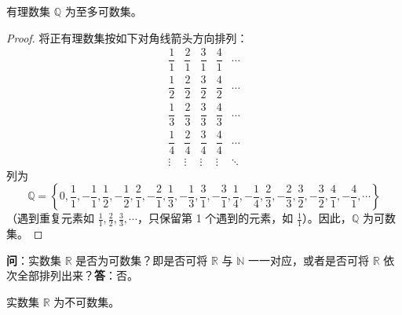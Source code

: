 \begin{lemma}\label{lem:1.3.2}
有理数集 $\mathbb{Q}$ 为至多可数集。
\end{lemma}

\begin{proof}
将正有理数集按如下对角线箭头方向排列：
\[
\begin{array}
{ccccc}
\dfrac{1}{1} & \dfrac{2}{1} & \dfrac{3}{1} & \dfrac{4}{1} & \cdots \\[2mm]
\dfrac{1}{2} & \dfrac{2}{2} & \dfrac{3}{2} & \dfrac{4}{2} & \cdots \\[2mm]
\dfrac{1}{3} & \dfrac{2}{3} & \dfrac{3}{3} & \dfrac{4}{3} & \cdots \\[2mm]
\dfrac{1}{4} & \dfrac{2}{4} & \dfrac{3}{4} & \dfrac{4}{4} & \cdots \\
\vdots & \vdots & \vdots & \vdots & \ddots
\end{array}
\]
列为
\[
\mathbb{Q} = \left\{0, \frac{1}{1}, -\frac{1}{1}, \frac{1}{2}, -\frac{1}{2}, \frac{2}{1}, -\frac{2}{1}, \frac{1}{3}, -\frac{1}{3}, \frac{3}{1}, -\frac{3}{1}, \frac{1}{4}, -\frac{1}{4}, \frac{2}{3}, -\frac{2}{3}, \frac{3}{2}, -\frac{3}{2}, \frac{4}{1}, -\frac{4}{1}, \cdots\right\}
\]
（遇到重复元素如 $\frac{1}{1}, \frac{2}{2}, \frac{3}{3}, \cdots$，只保留第 1 个遇到的元素，如 $\frac{1}{1}$）。因此，$\mathbb{Q}$ 为可数集。
\end{proof}

\textbf{问}：实数集 $\mathbb{R}$ 是否为可数集？即是否可将 $\mathbb{R}$ 与 $\mathbb{N}$ 一一对应，或者是否可将 $\mathbb{R}$ 依次全部排列出来？\textbf{答}：否。

\begin{theorem}\label{thm:1.3.4}
实数集 $\mathbb{R}$ 为不可数集。
\end{theorem}

